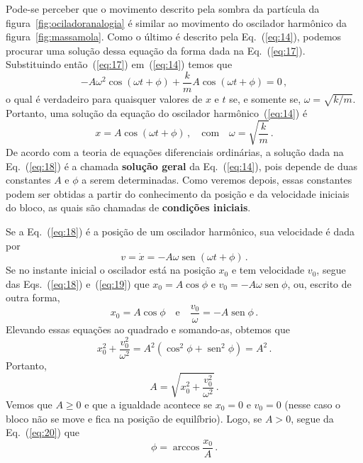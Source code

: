 \documentclass[twocolumn=on,fontsize=12pt,DIV=calc]{scrartcl}
\theoremstyle{definition}
\DeclareMathOperator{\sen}{sen}
\begin{document}
Pode-se perceber que o movimento descrito pela sombra da partícula da
figura~\ref{fig:ociladoranalogia} é similar ao movimento do oscilador
harmônico da figura~\ref{fig:massamola}. Como o último é descrito pela
Eq.~(\ref{eq:14}), podemos procurar uma solução dessa equação da forma
dada na Eq.~(\ref{eq:17}). Substituindo então~(\ref{eq:17})
em~(\ref{eq:14}) temos que
$$-A\omega^2\cos(\omega t+\phi)+\frac{k}{m}A\cos(\omega t+\phi)=0\,,$$
o qual é verdadeiro para quaisquer valores de $x$ e $t$ se, e somente
se, $\omega=\sqrt{k/m}$. Portanto, uma solução da equação do oscilador
harmônico~(\ref{eq:14}) é
\begin{equation}
  \label{eq:18}
  x=A\cos(\omega t+\phi)\,,\quad \text{com}\quad \omega=\sqrt{\frac{k}{m}}\,.
\end{equation}
De acordo com a teoria de equações diferenciais ordinárias, a solução
dada na Eq.~(\ref{eq:18}) é a chamada \textbf{solução geral} da
Eq.~(\ref{eq:14}), pois depende de duas constantes $A$ e $\phi$ a
serem determinadas. Como veremos depois, essas constantes podem ser
obtidas a partir do conhecimento da posição e da velocidade iniciais
do bloco, as quais são chamadas de \textbf{condições iniciais}.

Se a Eq.~(\ref{eq:18}) é a posição de um oscilador harmônico, sua
velocidade é dada por
\begin{equation}
  \label{eq:19}
  v=\dot x=-A\omega\sen(\omega t+\phi)\,.
\end{equation}
Se no instante inicial o oscilador está na posição $x_0$ e tem
velocidade $v_0$, segue das Eqs.~(\ref{eq:18}) e~(\ref{eq:19}) que
$x_0=A\cos\phi$ e $v_0=-A\omega\sen\phi$, ou, escrito de outra forma,
\begin{equation}
  \label{eq:20}
  x_0=A\cos\phi\quad\text{e}\quad \frac{v_0}{\omega}=-A\sen\phi\,.
\end{equation}
Elevando essas equações ao quadrado e somando-as, obtemos que
$$x_0^2+\frac{v_0^2}{\omega^2}=A^2(\cos^2\phi+\sen^2\phi)=A^2\,.$$
Portanto,
\begin{equation}
  \label{eq:21}
  A=\sqrt{x_0^2+\frac{v_0^2}{\omega^2}}\,.
\end{equation}
Vemos que $A\ge 0$ e que a igualdade acontece se $x_0=0$ e $v_0=0$
(nesse caso o bloco não se move e fica na posição de
equilíbrio). Logo, se $A>0$, segue da Eq.~(\ref{eq:20}) que
$$\phi=\arccos\frac{x_0}{A}\,.$$
\end{document}

